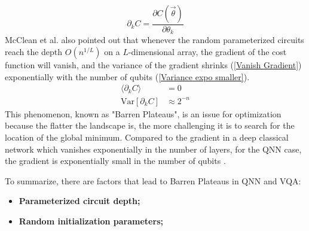 \begin{equation}
    \partial_k C = \frac{\partial C(\vec{\theta})}{\partial\theta_k}
\end{equation}
McClean et al.\cite{mccleanBarrenPlateausQuantum2018} also pointed out that whenever the random parameterized circuits reach the depth $O(n^{1/L})$ on a $L$-dimensional array, the gradient of the cost function will vanish, and the variance of the gradient shrinks (\ref{Vanish Gradient}) exponentially with the number of qubits (\ref{Variance expo smaller}).
\begin{align}
    \langle \partial_k C\rangle &= 0  \label{Vanish Gradient}\\
    \mathrm{Var}[\partial_k C] &\approx 2^{-n}  \label{Variance expo smaller}
\end{align}
This phenomenon, known as "Barren Plateaus", is an issue for optimization because the flatter the landscape is, the more challenging it is to search for the location of the global minimum.
Compared to the gradient in a deep classical network which vanishes exponentially in the number of layers, for the QNN case, the gradient is exponentially small in the number of qubits \cite{mccleanBarrenPlateausQuantum2018}.

To summarize, there are factors that lead to Barren Plateaus in QNN and VQA:
\begin{itemize}
    \item \textbf{Parameterized circuit depth;}
    \item \textbf{Random initialization parameters;}
\end{itemize}